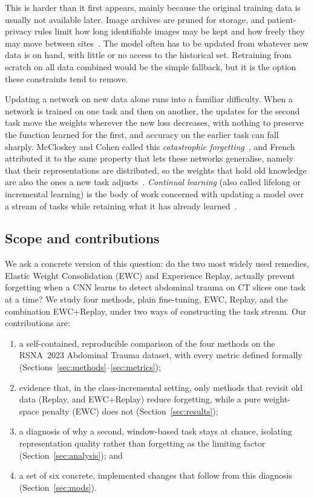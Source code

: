 \documentclass[11pt]{article}
\begin{document}
This is harder than it first appears, mainly because the original training data
is usually not available later. Image archives are pruned for storage, and
patient-privacy rules limit how long identifiable images may be kept and how
freely they may move between sites~\cite{lee2020clcardiac}. The model often has to
be updated from whatever new data is on hand, with little or no access to the
historical set. Retraining from scratch on all data combined would be the simple
fallback, but it is the option these constraints tend to remove.

Updating a network on new data alone runs into a familiar difficulty. When a
network is trained on one task and then on another, the updates for the second
task move the weights wherever the new loss decreases, with nothing to preserve
the function learned for the first, and accuracy on the earlier task can fall
sharply. McCloskey and Cohen called this \emph{catastrophic
forgetting}~\cite{mccloskey1989}, and French attributed it to the same property
that lets these networks generalise, namely that their representations are
distributed, so the weights that hold old knowledge are also the ones a new task
adjusts~\cite{french1999}. \emph{Continual learning} (also called lifelong or
incremental learning) is the body of work concerned with updating a model over a
stream of tasks while retaining what it has already learned~\cite{delange2021survey}.

\subsection{Scope and contributions}
We ask a concrete version of this question: do the two most widely used remedies,
Elastic Weight Consolidation (EWC) and Experience Replay, actually prevent
forgetting when a CNN learns to detect abdominal trauma on CT slices one task at
a time? We study four methods, plain fine-tuning, EWC, Replay, and the
combination EWC+Replay, under two ways of constructing the task stream. Our
contributions are:
\begin{enumerate}[leftmargin=1.7em,topsep=2pt,itemsep=2pt]
  \item a self-contained, reproducible comparison of the four methods on the
        RSNA~2023 Abdominal Trauma dataset, with every metric defined formally
        (Sections~\ref{sec:methods}--\ref{sec:metrics});
  \item evidence that, in the class-incremental setting, only methods that revisit
        old data (Replay, and EWC+Replay) reduce forgetting, while a pure
        weight-space penalty (EWC) does not (Section~\ref{sec:results});
  \item a diagnosis of why a second, window-based task stays at chance, isolating
        representation quality rather than forgetting as the limiting factor
        (Section~\ref{sec:analysis}); and
  \item a set of six concrete, implemented changes that follow from this
        diagnosis (Section~\ref{sec:mods}).
\end{enumerate}
\end{document}
